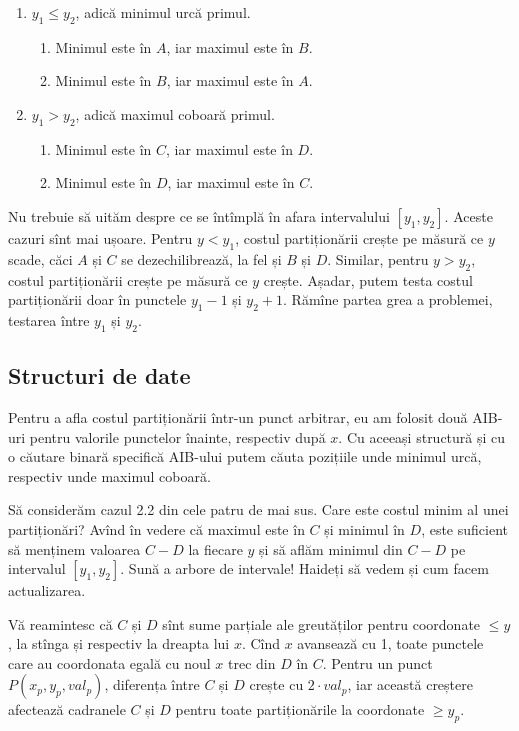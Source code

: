 \documentclass[../main.tex]{subfiles}
\begin{document}
\begin{enumerate}
  \item $y_1 \leq y_2$, adică minimul urcă primul.

  \begin{enumerate}
    \item Minimul este în $A$, iar maximul este în $B$.
    \item Minimul este în $B$, iar maximul este în $A$.
  \end{enumerate}

  \item $y_1 > y_2$, adică maximul coboară primul.

  \begin{enumerate}
    \item Minimul este în $C$, iar maximul este în $D$.
    \item Minimul este în $D$, iar maximul este în $C$.
  \end{enumerate}
\end{enumerate}

Nu trebuie să uităm despre ce se întîmplă în afara intervalului $[y_1, y_2]$. Aceste cazuri sînt mai ușoare. Pentru $y < y_1$, costul partiționării crește pe măsură ce $y$ scade, căci $A$ și $C$ se dezechilibrează, la fel și $B$ și $D$. Similar, pentru $y > y_2$, costul partiționării crește pe măsură ce $y$ crește. Așadar, putem testa costul partiționării doar în punctele $y_1 - 1$ și $y_2 + 1$. Rămîne partea grea a problemei, testarea între $y_1$ și $y_2$.

\subsection{Structuri de date}

Pentru a afla costul partiționării într-un punct arbitrar, eu am folosit două AIB-uri pentru valorile punctelor înainte, respectiv după $x$. Cu aceeași structură și cu o căutare binară specifică AIB-ului putem căuta pozițiile unde minimul urcă, respectiv unde maximul coboară.

Să considerăm cazul 2.2 din cele patru de mai sus. Care este costul minim al unei partiționări? Avînd în vedere că maximul este în $C$ și minimul în $D$, este suficient să menținem valoarea $C-D$ la fiecare $y$ și să aflăm minimul din $C-D$ pe intervalul $[y_1, y_2]$. Sună a arbore de intervale! Haideți să vedem și cum facem actualizarea.

Vă reamintesc că $C$ și $D$ sînt sume parțiale ale greutăților pentru coordonate $\leq y$, la stînga și respectiv la dreapta lui $x$. Cînd $x$ avansează cu 1, toate punctele care au coordonata egală cu noul $x$ trec din $D$ în $C$. Pentru un punct $P(x_p, y_p, val_p)$, diferența între $C$ și $D$ crește cu $2 \cdot val_p$, iar această creștere afectează cadranele $C$ și $D$ pentru toate partiționările la coordonate $\geq y_p$.
\end{document}

